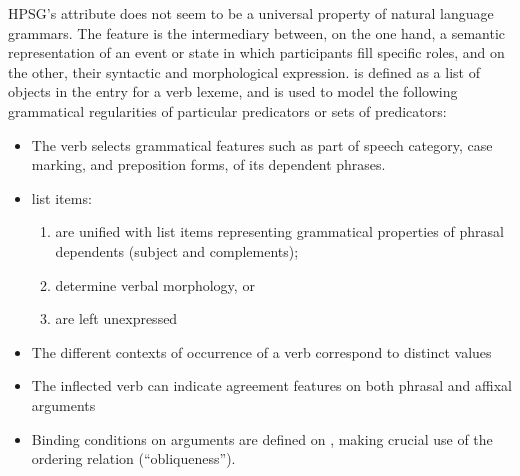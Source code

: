 \documentclass[output=paper
                ,modfonts
                ,nonflat
	        ,collection
	        ,collectionchapter
	        ,collectiontoclongg
 	        ,biblatex
                ,babelshorthands
                ,newtxmath
                ,draftmode
                ,colorlinks, citecolor=brown
]{./langsci/langscibook}
\begin{document}

HPSG's \argst attribute does not seem to be a universal property of natural
language grammars.  The \argst feature is the intermediary between, on
the one hand, a semantic representation of an event or state in which
participants fill specific roles, and on the other, their syntactic and
morphological expression.  \argst is defined as a list of 
objects in the entry for a verb lexeme, and is used to model the following grammatical regularities of particular predicators or sets of predicators:

\begin{itemize}
\item The verb selects grammatical features such as part of speech
category, case marking, and preposition forms, of its dependent
phrases.
\item \argst list items:
\begin{enumerate}
\item are unified with \val list items
representing grammatical properties of phrasal dependents (subject and
complements);
\item determine verbal morphology, or
\item are left unexpressed
\end{enumerate}
\item The different contexts of occurrence of a verb correspond to distinct \argst values
\item The inflected verb can indicate agreement features on both phrasal
and affixal arguments
\item Binding conditions on arguments are defined on \argst, making
crucial use of the ordering relation (``obliqueness'').
\end{itemize}
\end{document}

